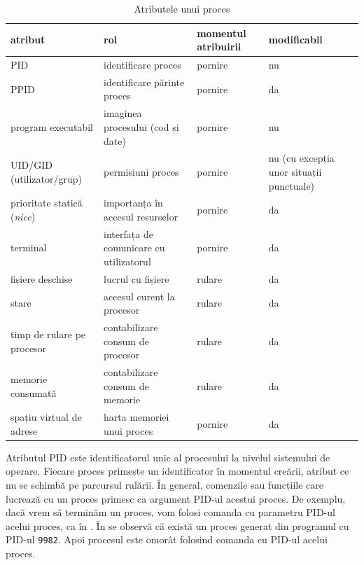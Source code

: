 \begin{table}[!htb]
\caption{Atributele unui proces}
\begin{center}
  \begin{tabular}{ p{} p{} p{} p{}  }
	\toprule
                \textbf{atribut} & \textbf{rol} & \textbf{momentul atribuirii} & \textbf{modificabil} \\
	\midrule
                PID & identificare proces & pornire & nu \\
	\midrule
                PPID & identificare părinte proces & pornire & da \\
	\midrule
                program executabil & imaginea procesului (cod și date) & pornire & nu \\
	\midrule
                UID/GID (utilizator/grup) & permisiuni proces & pornire & nu (cu excepția unor situații punctuale) \\
	\midrule
                prioritate statică (\textit{nice}) & importanța în accesul resurselor & pornire & da \\
        \midrule
                terminal & interfața de comunicare cu utilizatorul & pornire & da \\
        \midrule
                fișiere deschise & lucrul cu fișiere & rulare & da \\
        \midrule
                stare & accesul curent la procesor & rulare & da \\
        \midrule
                timp de rulare pe procesor & contabilizare consum de procesor & rulare & da \\
        \midrule
                memorie consumată & contabilizare consum de memorie & rulare & da \\
        \midrule
                spațiu virtual de adrese & harta memoriei unui proces & pornire & da \\
	\bottomrule
	\end{tabular}
        \label{table:process-attributes}
\end{center}
\end{table}

Atributul PID este identificatorul unic al procesului la nivelul sistemului de
operare. Fiecare proces primește un identificator în momentul creării, atribut
ce nu se schimbă pe parcursul rulării. În general, comenzile sau funcțiile care
lucrează cu un proces primesc ca argument PID-ul acestui proces. De exemplu,
dacă vrem să terminăm un proces, vom folosi comanda  cu parametru PID-ul
acelui proces, ca în .
În  se observă că există un proces generat din programul  cu PID-ul \texttt{9982}. Apoi procesul este omorât folosind comanda  cu PID-ul acelui proces.

